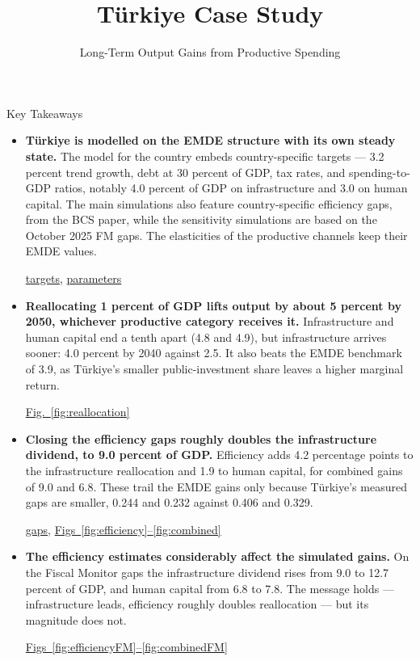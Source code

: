 \documentclass[aspectratio=169, 11pt, t]{beamer}
\title[]{Türkiye Case Study}
\subtitle{Long-Term Output Gains from Productive Spending}
\author{}
\institute{}
\date{}
\begin{document}
\begin{frame}[plain]
    \titlepage
\end{frame}

\begin{frame}{Key Takeaways}
    \vspace{1.0em}
    \scriptsize
    \begin{itemize}
        \setlength{\itemsep}{0.5em}
        \item \textbf{Türkiye is modelled on the EMDE structure with its own steady state.} The model for the country embeds country-specific targets --- 3.2 percent trend growth, debt at 30 percent of GDP, tax rates, and spending-to-GDP ratios, notably 4.0 percent of GDP on infrastructure and 3.0 on human capital. The main simulations also feature country-specific efficiency gaps, from the BCS paper, while the sensitivity simulations are based on the October 2025 FM gaps. The elasticities of the productive channels keep their EMDE values.
            {\tiny\par\hfill\hyperref[slide:targets]{targets}, \hyperref[slide:params]{parameters}}
        \item \textbf{Reallocating 1 percent of GDP lifts output by about 5 percent by 2050, whichever productive category receives it.} Infrastructure and human capital end a tenth apart (4.8 and 4.9), but infrastructure arrives sooner: 4.0 percent by 2040 against 2.5. It also beats the EMDE benchmark of 3.9, as Türkiye's smaller public-investment share leaves a higher marginal return.
            {\tiny\par\hfill\hyperref[fig:reallocation]{Fig.~\ref*{fig:reallocation}}}
        \item \textbf{Closing the efficiency gaps roughly doubles the infrastructure dividend, to 9.0 percent of GDP.} Efficiency adds 4.2 percentage points to the infrastructure reallocation and 1.9 to human capital, for combined gains of 9.0 and 6.8. These trail the EMDE gains only because Türkiye's measured gaps are smaller, 0.244 and 0.232 against 0.406 and 0.329.
            {\tiny\par\hfill\hyperref[slide:calib]{gaps}, \hyperref[fig:efficiency]{Figs~\ref*{fig:efficiency}--\ref*{fig:combined}}}
        \item \textbf{The efficiency estimates considerably affect the simulated gains.} On the Fiscal Monitor gaps the infrastructure dividend rises from 9.0 to 12.7 percent of GDP, and human capital from 6.8 to 7.8. The message holds --- infrastructure leads, efficiency roughly doubles reallocation --- but its magnitude does not.
            {\tiny\par\hfill\hyperref[fig:efficiencyFM]{Figs~\ref*{fig:efficiencyFM}--\ref*{fig:combinedFM}}}
    \end{itemize}
\end{frame}
\end{document}
